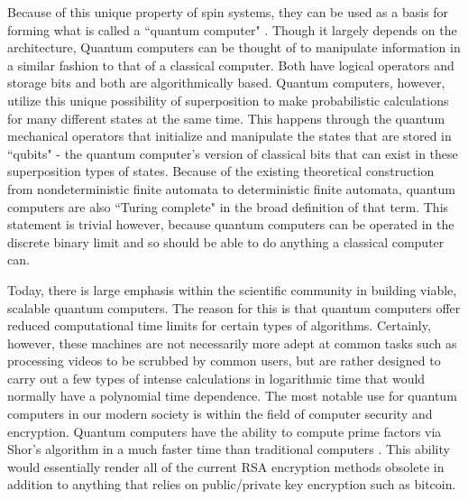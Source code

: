 \documentclass[oneside, noacknowlegments]{BYUPhys}
\begin{document}
Because of this unique property of spin systems, they can be used as a basis for forming what is called a ``quantum computer" \cite{RefWorks:doc:58929746e4b0dec22aee3a9a}. Though it largely depends on the architecture, Quantum computers can be thought of to manipulate information in a similar fashion to that of a classical computer. Both have logical operators and storage bits and both are algorithmically based. Quantum computers, however, utilize this unique possibility of superposition to make probabilistic calculations for many different states at the same time. This happens through the quantum mechanical operators that initialize and manipulate the states that are stored in ``qubits" - the quantum computer's version of classical bits that can exist in these superposition types of states. Because of the existing theoretical construction from nondeterministic finite automata to deterministic finite automata, quantum computers are also ``Turing complete" in the broad definition of that term. This statement is trivial however, because quantum computers can be operated in the discrete binary limit and so should be able to do anything a classical computer can.

Today, there is large emphasis within the scientific community in building viable, scalable quantum computers. The reason for this is that quantum computers offer reduced computational time limits for certain types of algorithms. Certainly, however, these machines are not necessarily more adept at common tasks such as processing videos to be scrubbed by common users, but are rather designed to carry out a few types of intense calculations in logarithmic time that would normally have a polynomial time dependence. The most notable use for quantum computers in our modern society is within the field of computer security and encryption. Quantum computers have the ability to compute prime factors via Shor's algorithm in a much faster time than traditional computers \cite{RefWorks:doc:589296c6e4b0d4c09201f6f5}. This ability would essentially render all of the current RSA encryption methods obsolete in addition to anything that relies on public/private key encryption such as bitcoin.
\end{document}
